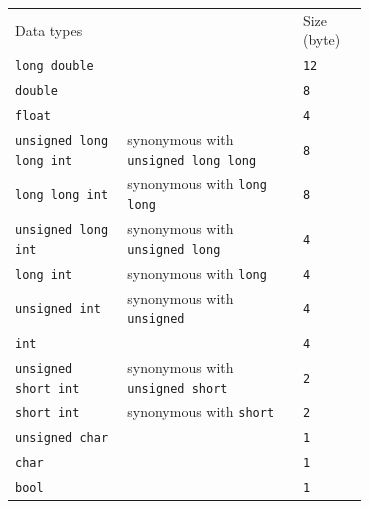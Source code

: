 \documentclass[10pt]{beamer}
\begin{document}
\begin{frame}
	\centering\scriptsize\renewcommand{\arraystretch}{1.8}
	\begin{tabular}{p{0.238\linewidth} p{0.36\linewidth} p{0.1\linewidth}}
		
		\rowcolor{cyan}\color{white} Data types & & \color{white} Size (byte)\\
		
		\rowcolor{lightcyan} \texttt{long double} & \texttt{} & \hspace{13pt}\texttt{12}\\
		\rowcolor{lightcyan} \texttt{double} & \texttt{} & \hspace{16pt}\texttt{8}\\
		\rowcolor{lightcyan} \texttt{float} & \texttt{} & \hspace{16pt}\texttt{4}\\
		\rowcolor{lightcyan} \texttt{unsigned long long int} & synonymous with \texttt{unsigned long long} & \hspace{16pt}\texttt{8}\\
		\rowcolor{lightcyan} \texttt{long long int} & synonymous with \texttt{long long} & \hspace{16pt}\texttt{8}\\
		\rowcolor{lightcyan} \texttt{unsigned long int} & synonymous with \texttt{unsigned long} & \hspace{16pt}\texttt{4}\\
		\rowcolor{lightcyan} \texttt{long int} & synonymous with \texttt{long} & \hspace{16pt}\texttt{4}\\
		\rowcolor{lightcyan} \texttt{unsigned int} & synonymous with \texttt{unsigned} & \hspace{16pt}\texttt{4}\\
		\rowcolor{lightcyan} \texttt{int} & \texttt{} & \hspace{16pt}\texttt{4}\\
		\rowcolor{lightcyan} \texttt{unsigned short int} & synonymous with \texttt{unsigned short} & \hspace{16pt}\texttt{2}\\
		\rowcolor{lightcyan} \texttt{short int} & synonymous with \texttt{short} & \hspace{16pt}\texttt{2}\\
		\rowcolor{lightcyan} \texttt{unsigned char} & \texttt{} & \hspace{16pt}\texttt{1}\\
		\rowcolor{lightcyan} \texttt{char} & \texttt{} & \hspace{16pt}\texttt{1}\\
		\rowcolor{lightcyan} \texttt{bool} & \texttt{} & \hspace{16pt}\texttt{1}\\
		
	\end{tabular}
\end{frame}
\end{document}
